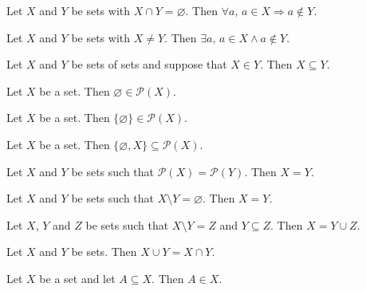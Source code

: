 \begin{chapex} %
Let $X$ and $Y$ be sets with $X \cap Y = \varnothing$. Then $\forall a,\, a \in X \Rightarrow a \not\in Y$.
\end{chapex}

\begin{chapex} %
Let $X$ and $Y$ be sets with $X \ne Y$. Then $\exists a,\, a \in X \wedge a \not\in Y$.
\end{chapex}

\begin{chapex} %
Let $X$ and $Y$ be sets of sets and suppose that $X \in Y$. Then $X \subseteq Y$.
\end{chapex}

\begin{chapex} %
Let $X$ be a set. Then $\varnothing \in \mathcal{P}(X)$.
\end{chapex}

\begin{chapex} %
Let $X$ be a set. Then $\{ \varnothing \} \in \mathcal{P}(X)$.
\end{chapex}

\begin{chapex} %
Let $X$ be a set. Then $\{ \varnothing, X \} \subseteq \mathcal{P}(X)$.
\end{chapex}

\begin{chapex} %
Let $X$ and $Y$ be sets such that $\mathcal{P}(X) = \mathcal{P}(Y)$. Then $X = Y$.
\end{chapex}

\begin{chapex} %
Let $X$ and $Y$ be sets such that $X \setminus Y = \varnothing$. Then $X = Y$.
\end{chapex}

\begin{chapex} %
Let $X$, $Y$ and $Z$ be sets such that $X \setminus Y = Z$ and $Y \subseteq Z$. Then $X = Y \cup Z$.
\end{chapex}

\begin{chapex} %
Let $X$ and $Y$ be sets. Then $X \cup Y = X \cap Y$.
\end{chapex}

\begin{chapex} %
\label{cqSetsASNEnd}
Let $X$ be a set and let $A \subseteq X$. Then $A \in X$.
\end{chapex}
